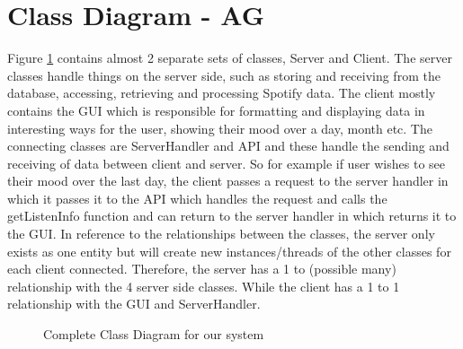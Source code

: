 \documentclass[10pt, notitlepage]{report}
\begin{document}
\section{Class Diagram - AG}

Figure \ref{fig:classdia} contains almost 2 separate sets of classes, Server and Client. The server classes handle things on the server side, such as storing and receiving from the database, accessing, retrieving and processing Spotify data. The client mostly contains the GUI which is responsible for formatting and displaying data in interesting ways for the user, showing their mood over a day, month etc. The connecting classes are ServerHandler and API and these handle the sending and receiving of data between client and server. So for example if user wishes to see their mood over the last day, the client passes a request to the server handler in which it passes it to the API which handles the request and calls the getListenInfo function and can return to the server handler in which returns it to the GUI. In reference to the relationships between the classes, the server only exists as one entity but will create new instances/threads of the other classes for each client connected. Therefore, the server has a 1 to (possible many) relationship with the 4 server side classes. While the client has a 1 to 1 relationship with the GUI and ServerHandler.

\begin{figure}[h]
	\centering
	\caption{Complete Class Diagram for our system}
	\label{fig:classdia}
\end{figure}
\end{document}
